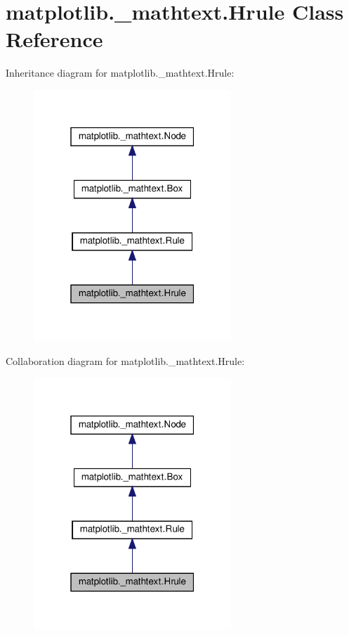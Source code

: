 \hypertarget{classmatplotlib_1_1__mathtext_1_1Hrule}{}\section{matplotlib.\+\_\+mathtext.\+Hrule Class Reference}
\label{classmatplotlib_1_1__mathtext_1_1Hrule}


Inheritance diagram for matplotlib.\+\_\+mathtext.\+Hrule\+:
\nopagebreak
\begin{figure}[H]
\begin{center}
\leavevmode
\includegraphics[width=211pt]{classmatplotlib_1_1__mathtext_1_1Hrule__inherit__graph}
\end{center}
\end{figure}


Collaboration diagram for matplotlib.\+\_\+mathtext.\+Hrule\+:
\nopagebreak
\begin{figure}[H]
\begin{center}
\leavevmode
\includegraphics[width=211pt]{classmatplotlib_1_1__mathtext_1_1Hrule__coll__graph}
\end{center}
\end{figure}
